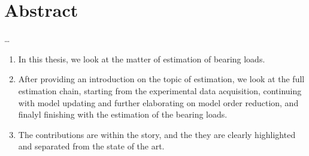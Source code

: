 \chapter{Abstract}                                 \label{ch:abstract}

\ldots

\begin{enumerate}
    \item In this thesis, we look at the matter of estimation of bearing loads.
    \item After providing an introduction on the topic of estimation, we look at the full estimation chain, starting from the experimental data acquisition, continuing with model updating and further elaborating on model order reduction, and finalyl finishing with the estimation of the bearing loads.
    \item The contributions are within the story, and the they are clearly highlighted and separated from the state of the art.
\end{enumerate}

\instructionsabstract


\cleardoublepage

